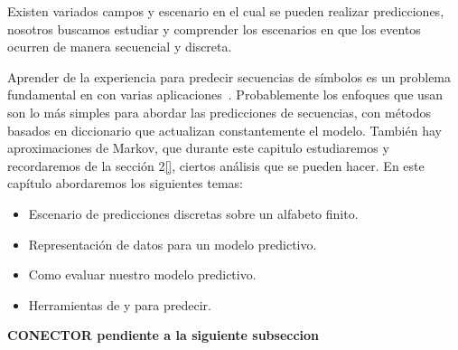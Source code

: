 Existen variados campos y escenario en el cual se pueden realizar predicciones, nosotros buscamos estudiar y comprender los escenarios en que los eventos ocurren de manera secuencial y discreta. 

Aprender de la experiencia para predecir secuencias de símbolos es un problema fundamental en \machinelearning con varias aplicaciones~\cite{Laird1994}. Probablemente los enfoques que usan \losslessdatacompression son lo más simples para abordar las predicciones de secuencias, con métodos basados en diccionario que actualizan constantemente el modelo. También hay aproximaciones de Markov, que durante este capitulo estudiaremos y recordaremos de la sección 2\ref{}, ciertos análisis que se pueden hacer. En este capítulo abordaremos los siguientes temas:








\begin{itemize}
	\menorEspacioItemize
	\item Escenario de predicciones discretas sobre un alfabeto finito.
	\item Representación de datos para un modelo predictivo.
	\item Como evaluar nuestro modelo predictivo.
	\item Herramientas de \machinelearning y \losslessdatacompression para predecir.
\end{itemize}




\textbf{CONECTOR pendiente a la siguiente subseccion}